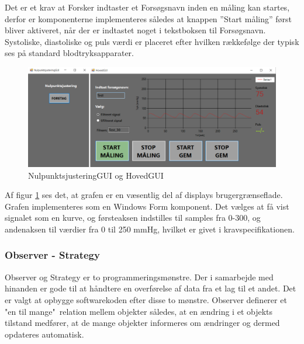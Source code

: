 Det er et krav at Forsker indtaster et Forsøgsnavn inden en måling kan startes, derfor er komponenterne implementeres således at knappen ”Start måling” først bliver aktiveret, når der er indtastet noget i tekstboksen til Forsøgsnavn. Systoliske, diastoliske og puls værdi er placeret efter hvilken rækkefølge der typisk ses på standard blodtryksapparater. 
\begin{figure}[H]
	\centering
	\includegraphics[width=1.0\textwidth]{Figurer/NulHovedGUI}
	\caption{NulpunktsjusteringGUI og HovedGUI}
	\label{fig:FormsSW}
\end{figure}
Af figur \ref{fig:FormsSW} ses det, at grafen er en væsentlig del af displays brugergrænseflade. Grafen implementeres som en Windows Form komponent. Det vælges at få vist signalet som en kurve, og førsteaksen indstilles til samples fra 0-300, og andenaksen til værdier fra 0 til 250 mmHg, hvilket er givet i kravspecifikationen. 

\subsubsection{Observer - Strategy}
Observer og Strategy er to programmeringsmønstre. Der i samarbejde med hinanden er gode til at håndtere en overførelse af data fra et lag til et andet. Det er valgt at opbygge softwarekoden efter disse to mønstre. Observer definerer et "en til mange"\ relation mellem objekter således, at en ændring i et objekts tilstand medfører, at de mange objekter informeres om ændringer og dermed opdateres automatisk.

